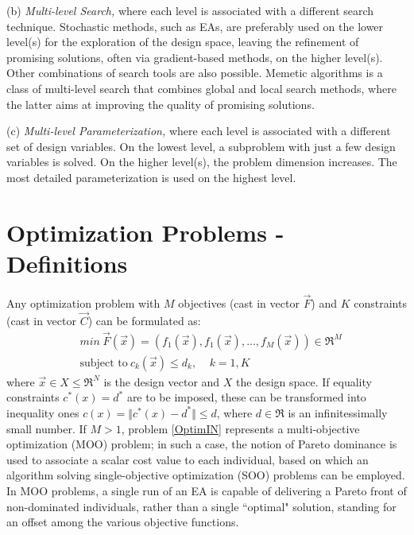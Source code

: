 (b) \emph{Multi-level Search,} where each level is associated with a
different search technique. Stochastic methods, such as EAs, are
preferably used on the lower level(s) for the exploration of the
design space, leaving the refinement of promising solutions, often via gradient-based methods, on the higher level(s). Other
combinations of search tools are also possible. Memetic algorithms \cite{Krans2005,Ong2004,Ong2006,LTT_2_043,LTT_2_053,LTT_4_04} is a class of multi-level search that combines global and local search methods, where the latter aims at improving the quality of
promising solutions.


(c) \emph{Multi-level Parameterization,} where each level is
associated with a different set of design variables. On the lowest
level, a subproblem with just a few design variables is solved. On
the higher level(s), the problem dimension increases. The most detailed parameterization is used on the highest level.



\section{Optimization Problems - Definitions}
\label{OPt_def}
Any optimization problem with $M$ objectives (cast in vector $\vec{F}$) and $K$ constraints (cast in vector $\vec{C}$) can be formulated as:
\begin{align} 
   &min ~ \vec{F}(\vec{x})=(f_1(\vec{x}),f_1(\vec{x}),...,f_M(\vec{x}))\in \Re^{M} \nonumber \\
   &\mbox{subject to} ~ c_k(\vec{x})\leq d_k, ~~~~~ k =1,K
\label{OptimIN}
\end{align}
where $\vec{x}\in X \!\leq\! \Re^{N}$ is the design vector and $X$ the design space. If equality constraints $ c^*(x)=d^* $ are to be imposed, these can be transformed into inequality ones $ c(x)=\Vert c^*(x)-d^*\Vert \leq d $, where $ d \in \Re $ is an infinitessimally small number. If $M \!> \!1$, problem \ref{OptimIN} represents a multi-objective optimization (MOO) problem; in such a case, the notion of Pareto dominance \cite{Zitzler2000} is used to associate a scalar cost value to each individual, based on which an algorithm solving single-objective optimization (SOO) problems can be employed. In MOO problems, a single run of an EA is capable of delivering a Pareto front of non-dominated individuals, rather than a single ``optimal" solution, standing for an offset among the various objective functions. 


